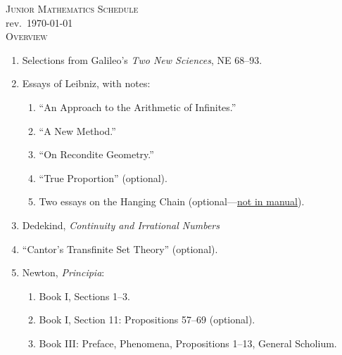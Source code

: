 \documentclass[10pt]{article}
\begin{document}

\begin{center}
  \textsc{Junior Mathematics Schedule}\\[5pt]
  \footnotesize{rev.~\today}\\[30pt]
  \textsc{\small{Overview}}
\end{center}

\bigskip

\begin{enumerate}[noitemsep]
  \item Selections from Galileo's \emph{Two New Sciences}, NE 68--93.
  \item Essays of Leibniz, with notes:
    \begin{enumerate}
      \item ``An Approach to the Arithmetic of Infinites.''
      \item ``A New Method.''
      \item ``On Recondite Geometry.''
      \item ``True Proportion'' (optional).
      \item Two essays on the Hanging Chain (optional---\href{https://drive.google.com/file/d/1Q06ypQH26GPMVsxn8SRQVEEn79qmUxOE/view?usp=sharing}{not in manual}).
\end{enumerate}
  \item Dedekind, \emph{Continuity and Irrational Numbers}
  \item ``Cantor's Transfinite Set Theory'' (optional).
  \item Newton, \emph{Principia}:
    \begin{enumerate}
      \item Book I, Sections 1--3.
      \item Book I, Section 11: Propositions 57--69 (optional).
      \item Book III: Preface, Phenomena, Propositions 1--13, General Scholium.
    \end{enumerate}
\end{enumerate}
\end{document}
